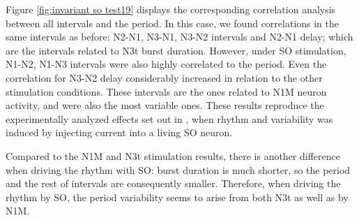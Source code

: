 Figure \ref{fig:invariant so test19} displays the corresponding correlation analysis between all intervals and the period. %
In this case, we found correlations in the same intervals as before: N2-N1, N3-N1, N3-N2 intervals and N2-N1 delay; which are the intervals related to N3t burst duration. However, under SO stimulation,  N1-N2, N1-N3 intervals were also highly correlated to the period. Even the correlation for N3-N2 delay considerably increased in relation to the other stimulation conditions. These intervals are the ones related to N1M neuron activity, and were also the most variable ones.  These results reproduce the experimentally analyzed effects set out in \parencite{elliott_temporal_1991}, when rhythm and variability was induced by injecting current into a living SO neuron.


Compared to the N1M and N3t stimulation results, there is another difference when driving the rhythm with SO: burst duration is much shorter, so the period and the rest of intervals are consequently smaller. Therefore, when driving the rhythm by SO, the period variability seems to arise from both N3t as well as by N1M. 
%
%      
%
%

